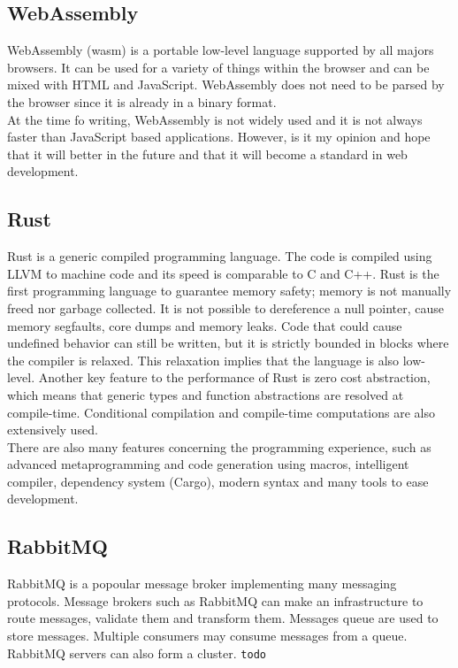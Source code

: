\documentclass[../documentation.tex]{subfiles}
\begin{document}
\subsection{WebAssembly}

WebAssembly (wasm) is a portable low-level language supported by all majors browsers.
It can be used for a variety of things within the browser and can be mixed
with HTML and JavaScript.
WebAssembly does not need to be parsed by the browser since it is already
in a binary format. \\
At the time fo writing, WebAssembly is not widely used
and it is not always faster than JavaScript based applications.
However, is it my opinion and hope that it will
better in the future and that it will become a standard in
web development.

\subsection{Rust}

Rust is a generic compiled programming language.
The code is compiled using LLVM to machine code and its speed
is comparable to C and C++.
Rust is the first programming language to guarantee memory safety;
memory is not manually freed nor garbage collected.
It is not possible to dereference a null pointer, cause memory segfaults, core dumps
and memory leaks.
Code that could cause undefined behavior can still be written,
but it is strictly bounded in blocks where the compiler is relaxed.
This relaxation implies that the language is also low-level.
Another key feature to the performance of Rust is zero cost abstraction,
which means that generic types and function abstractions are resolved at compile-time.
Conditional compilation and compile-time computations are also extensively used.
\\
There are also many features concerning the programming experience, such as
advanced metaprogramming and code generation using macros, intelligent compiler,
dependency system (Cargo), modern syntax and many tools to ease development.

\subsection{RabbitMQ}

RabbitMQ is a popoular message broker implementing many messaging protocols.
Message brokers such as RabbitMQ can make an infrastructure to route messages,
validate them and transform them. Messages queue are used
to store messages. Multiple consumers may consume messages from a queue. \\
RabbitMQ servers can also form a cluster. \texttt{todo}
\end{document}
